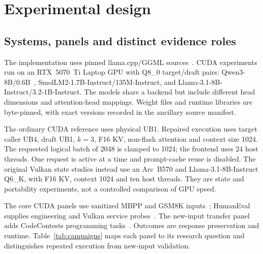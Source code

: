 \section{Experimental design}
\label{sec:experiments}
\subsection{Systems, panels and distinct evidence roles}
The implementation uses pinned llama.cpp/GGML sources~\cite{llamacpp,studyrecords}. CUDA experiments run on an RTX~5070~Ti Laptop GPU with Q8\_0 target/draft pairs: Qwen3-8B/0.6B~\cite{qwen3}, SmolLM2-1.7B-Instruct/135M-Instruct, and Llama-3.1-8B-Instruct/3.2-1B-Instruct. The models share a backend but include different head dimensions and attention-head mappings. Weight files and runtime libraries are byte-pinned, with exact versions recorded in the ancillary source manifest.

The ordinary CUDA reference uses physical UB1. Repaired execution uses target caller UB4, draft UB1, $k=3$, F16 KV, non-flash attention and context size 1024. The requested logical batch of 2048 is clamped to 1024; the frontend uses 24 host threads. One request is active at a time and prompt-cache reuse is disabled. The original Vulkan state studies instead use an Arc~B570 and Llama-3.1-8B-Instruct Q6\_K, with F16 KV, context 1024 and ten host threads. They are state and portability experiments, not a controlled comparison of GPU speed.

The core CUDA panels use sanitized MBPP and GSM8K inputs~\cite{mbpp,gsm8k}; HumanEval supplies engineering and Vulkan service probes~\cite{humaneval}. The new-input transfer panel adds CodeContests programming tasks~\cite{rtxtransferrecords}. Outcomes are response preservation and runtime. Table~\ref{tab:campaigns} maps each panel to its research question and distinguishes repeated execution from new-input validation.

